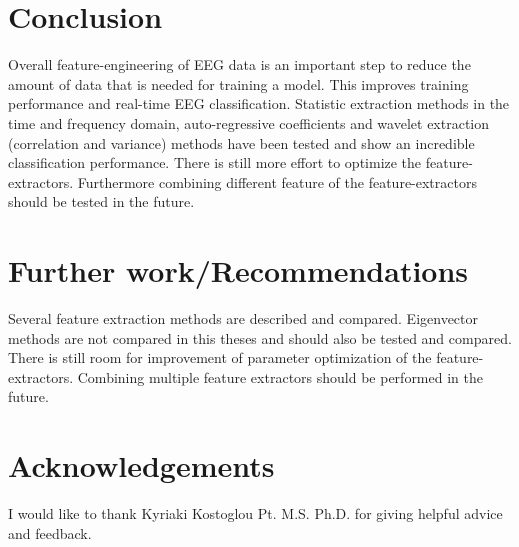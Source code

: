 \documentclass{article}
\begin{document}
\section{Conclusion}
Overall feature-engineering of EEG data is an important step to reduce the amount of data that is needed for training a model. This improves training performance and real-time EEG classification. Statistic extraction methods in the time and frequency domain, auto-regressive coefficients and wavelet extraction (correlation and variance) methods have been tested and show an incredible classification performance. There is still more effort to optimize the feature-extractors. Furthermore combining different feature of the feature-extractors should be tested in the future. 

\section{Further work/Recommendations}
Several feature extraction methods are described and compared. Eigenvector methods are not compared in this theses and should also be tested and compared. There is still room for improvement of parameter optimization of the feature-extractors. Combining multiple feature extractors should be performed in the future.

\section{Acknowledgements}
I would like to thank Kyriaki Kostoglou Pt. M.S. Ph.D. for giving helpful advice and feedback.

\printbibliography
\end{document}
